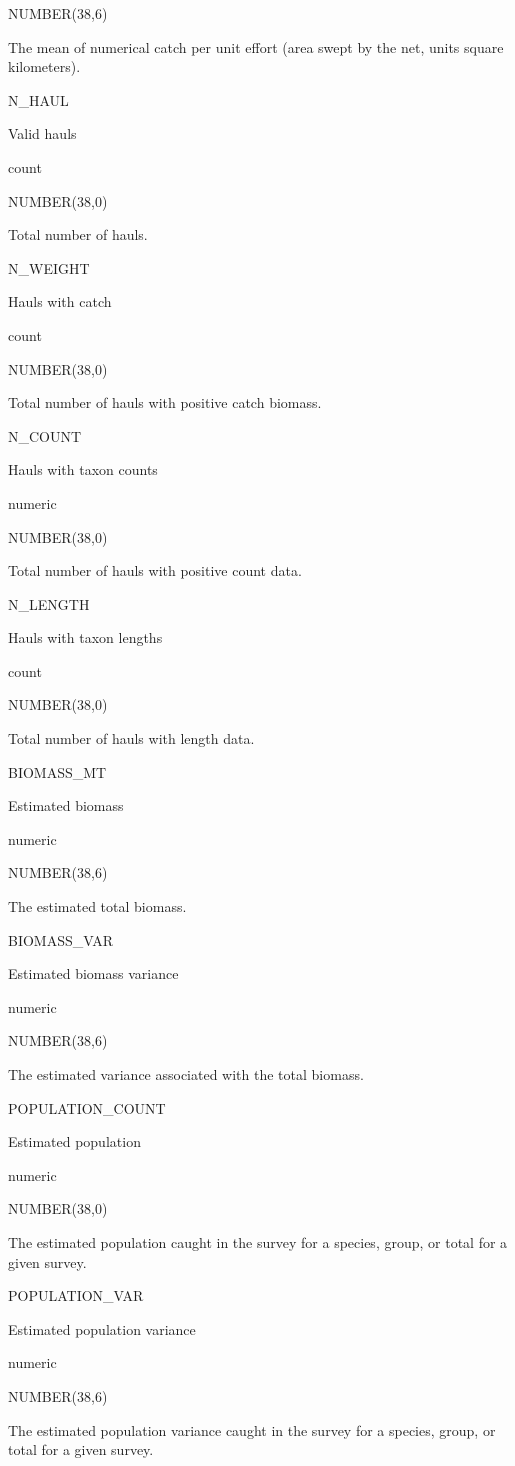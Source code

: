 \documentclass[
  letterpaper,
  oneside,
  open=any]{scrbook}
\begin{document}
NUMBER(38,6)

The mean of numerical catch per unit effort (area swept by the net,
units square kilometers).

N\_HAUL

Valid hauls

count

NUMBER(38,0)

Total number of hauls.

N\_WEIGHT

Hauls with catch

count

NUMBER(38,0)

Total number of hauls with positive catch biomass.

N\_COUNT

Hauls with taxon counts

numeric

NUMBER(38,0)

Total number of hauls with positive count data.

N\_LENGTH

Hauls with taxon lengths

count

NUMBER(38,0)

Total number of hauls with length data.

BIOMASS\_MT

Estimated biomass

numeric

NUMBER(38,6)

The estimated total biomass.

BIOMASS\_VAR

Estimated biomass variance

numeric

NUMBER(38,6)

The estimated variance associated with the total biomass.

POPULATION\_COUNT

Estimated population

numeric

NUMBER(38,0)

The estimated population caught in the survey for a species, group, or
total for a given survey.

POPULATION\_VAR

Estimated population variance

numeric

NUMBER(38,6)

The estimated population variance caught in the survey for a species,
group, or total for a given survey.
\end{document}
